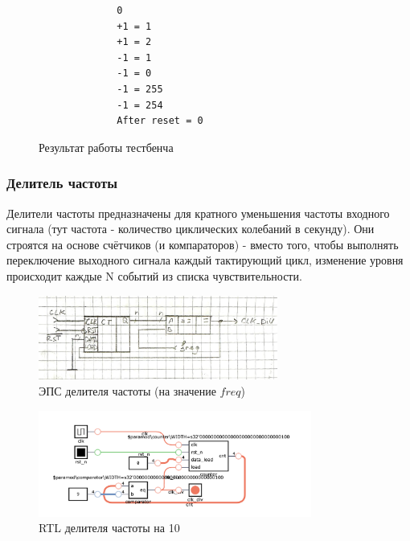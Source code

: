 \documentclass[a4paper]{article}
\begin{document}
  \begin{figure}[H]
    \begin{subfigure}[b]{0.75\textwidth}
      \centering
    \end{subfigure}
    \hfill
    \begin{subfigure}[b]{0.2\textwidth}
      \begin{verbatim}
        0
        +1 = 1
        +1 = 2
        -1 = 1
        -1 = 0
        -1 = 255
        -1 = 254
        After reset = 0
      \end{verbatim}
    \end{subfigure}
    \caption{Результат работы тестбенча}
  \end{figure}

  \subsubsection{Делитель частоты}

  Делители частоты предназначены для кратного уменьшения частоты входного сигнала
  (тут частота - количество циклических колебаний в секунду). Они строятся на основе
  счётчиков (и компараторов) - вместо того, чтобы выполнять переключение выходного
  сигнала каждый тактирующий цикл, изменение уровня происходит каждые N событий
  из списка чувствительности.

  \begin{figure}[H]
    \centering
    \includegraphics[width=0.7\textwidth]{lab_38.jpg} 
    \caption{ЭПС делителя частоты (на значение $freq$)}   
  \end{figure}

  \begin{figure}[H]
    \centering
    \includegraphics[width=0.8\textwidth]{lab_39.png}
    \caption{RTL делителя частоты на 10}
  \end{figure}
\end{document}
